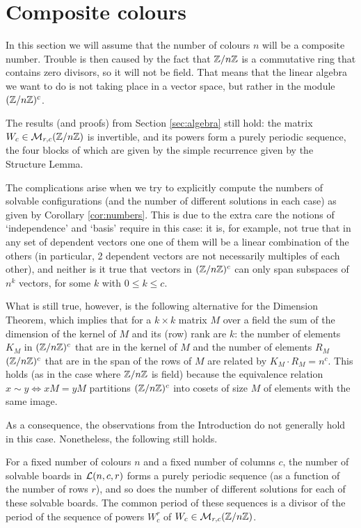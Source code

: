 \section{Composite colours}\label{sec:comp}
In this section we will assume that the number of colours $n$
will be a composite number. Trouble is then caused by the fact
that $\mathbb{Z}/n\mathbb{Z}$ is a commutative ring that contains zero divisors,
so it will not be field. That means that the linear algebra we
want to do is not taking place in a vector space, but rather
in the module $(\mathbb{Z}/n\mathbb{Z})^c$.

The results (and proofs) from Section \ref{sec:algebra} still hold:
the matrix $W_c\in\mathcal{M}_{r,c}(\mathbb{Z}/n\mathbb{Z})$ is invertible, and its
powers form a purely periodic sequence, the four blocks of which
are given by the simple recurrence given by the Structure Lemma.

The complications arise when we try to explicitly compute
the numbers of solvable configurations (and the number of
different solutions in each case) as given by Corollary \ref{cor:numbers}.
This is due to the extra care the notions of `independence'
and `basis' require in this case: it is, for example, not true that
in any set of dependent vectors one one of them will be a linear combination
of the others (in particular, 2 dependent vectors are not
necessarily multiples of each other),
and neither is it true that vectors in $(\mathbb{Z}/n\mathbb{Z})^c$ can only span
subspaces of $n^k$ vectors, for some $k$ with $0\leq k\leq c$.

What is still true, however, is the following alternative for
the Dimension Theorem, which implies that for a $k\times k$
matrix $M$ over a field the sum of the dimension of the kernel
of $M$ and its (row) rank are $k$:
the number of elements $K_M$ in $(\mathbb{Z}/n\mathbb{Z})^c$ that are in the kernel
of $M$ and the number of elements $R_M$ $(\mathbb{Z}/n\mathbb{Z})^c$ that are in the 
span of the rows of $M$ are related by $K_M\cdot R_M=n^c$.
This holds (as in the case where $\mathbb{Z}/n\mathbb{Z}$ is field) because
the equivalence relation $x \sim y\iff xM=yM$ partitions
$(\mathbb{Z}/n\mathbb{Z})^c$ into cosets of size $M$ of elements
with the same image.

As a consequence, the observations from the Introduction do not
generally hold in this case. Nonetheless, the following still holds.

\begin{theorem}
For a fixed number of colours $n$ and a fixed number of columns $c$,
the number of solvable boards in $\mathcal{L}(n, c, r)$ forms a purely periodic
sequence (as a function of the number of rows $r$), and so does the
number of different solutions for each of these solvable boards.
The common period of these sequences is a divisor of the period of the sequence
of powers $W_c^r$ of $W_c\in\mathcal{M}_{r,c}(\mathbb{Z}/n\mathbb{Z})$.
\end{theorem}

